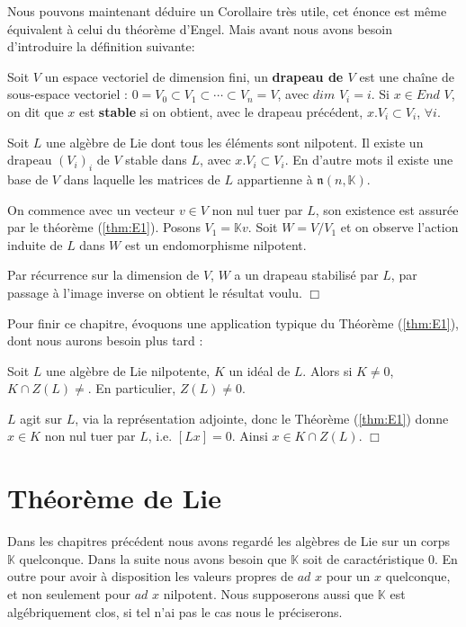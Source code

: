 \documentclass[a4paper,openany,12pt]{report}
\newcommand{\KK}{\mathbb{K}}
\newcommand{\nn}{\mathfrak{n}}
\theoremstyle{break}
{\theorembodyfont{\upshape}
\newtheorem*{rmq}{Remarque :}
\newtheorem*{prv}{Preuve :}
\newtheorem*{ex}{Exemples :}
\newtheorem{exe}{Exemple : }
\newtheorem*{nota}{Notation :}}
\begin{document}
Nous pouvons maintenant déduire un Corollaire très utile, cet énonce est même équivalent à celui du théorème d'Engel. Mais avant nous avons besoin d'introduire la définition suivante:

\begin{df}
\quad Soit $V$ un espace vectoriel de dimension fini, un \textbf{drapeau de $V$} est une chaîne de sous-espace vectoriel : $0 = V_{0} \subset V_{1} \subset \cdots \subset V_{n} = V$, avec $dim$ $V_{i} = i$.
Si $x \in End$ $V$, on dit que $x$ est \textbf{stable} si on obtient, avec le drapeau précédent, $x.V_{i} \subset V_{i}$, $\forall i$.
\end{df}

\begin{cor}\label{cor:E1}
\quad Soit $L$ une algèbre de Lie dont tous les éléments sont nilpotent. Il existe un drapeau $(V_{i})_{i}$ de $V$ stable dans $L$, avec $x.V_{i} \subset V_{i}$. En d'autre mots il existe une base de $V$ dans laquelle les matrices de $L$ appartienne à $\nn(n,\KK)$.
\end{cor}

\begin{prv}
\quad On commence avec un vecteur $v \in V$ non nul tuer par $L$, son existence est assurée par le théorème (\ref{thm:E1}). Posons $V_{1} = \KK v$. Soit $W= V/V_{1}$ et on observe l'action induite de $L$ dans $W$ est un endomorphisme nilpotent.

Par récurrence sur la dimension de $V$, $W$ a un drapeau stabilisé par $L$, par passage à l'image inverse on obtient le résultat voulu. $\Box$
\end{prv}

Pour finir ce chapitre, évoquons une application  typique du Théorème (\ref{thm:E1}), dont nous aurons besoin plus tard : 

\begin{lem}\label{lem:E2}
\quad Soit $L$ une algèbre de Lie nilpotente, $K$ un idéal de $L$. Alors si $K \neq 0$, $K \cap Z(L) \neq$.
En particulier, $Z(L) \neq 0$.
\end{lem}

\begin{prv}
\quad $L$ agit sur $L$, via la représentation adjointe, donc le Théorème (\ref{thm:E1}) donne $x \in K$ non nul tuer par $L$, i.e. $[Lx]=0$. Ainsi $x \in K \cap Z(L)$. $\Box$
\end{prv}

\chapter{Théorème de Lie}
\quad Dans les chapitres précédent nous avons regardé les algèbres de Lie sur un corps $\KK$ quelconque. Dans la suite nous avons besoin que $\KK$ soit de caractéristique $0$. En outre pour avoir à disposition les valeurs propres de $ad$ $x$ pour un $x$ quelconque, et non seulement pour $ad$ $x$ nilpotent. Nous supposerons aussi que $\KK$ est algébriquement clos, si tel n'ai pas le cas nous le préciserons.
\end{document}
